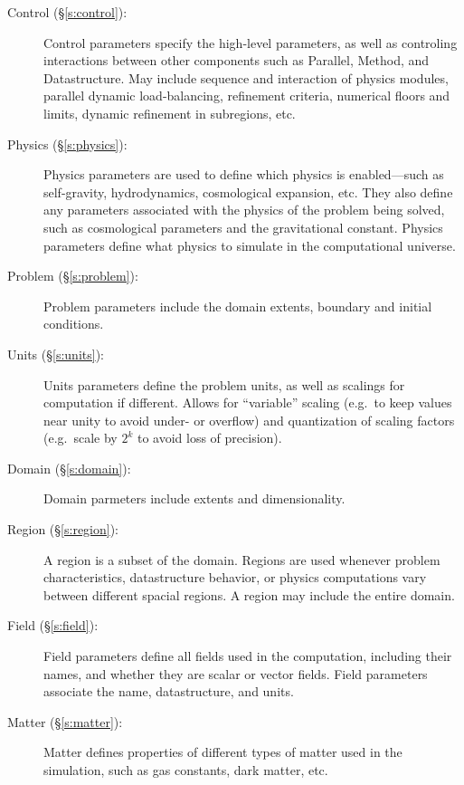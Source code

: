 \begin{description}

 \item [Control (\S\ref{s:control}): ] Control parameters specify the
 high-level parameters, as well as controling interactions between
 other components such as Parallel, Method, and Datastructure.  May
 include sequence and interaction of physics modules, parallel dynamic
 load-balancing, refinement criteria, numerical floors and limits,
 dynamic refinement in subregions, etc.

 \item [Physics (\S\ref{s:physics}): ] Physics parameters are used to
 define which physics is enabled---such as self-gravity,
 hydrodynamics, cosmological expansion, etc.  They also define any
 parameters associated with the physics of the problem being solved,
 such as cosmological parameters and the gravitational constant.
 Physics parameters define what physics to simulate in the
 computational universe.

 \item [Problem (\S\ref{s:problem}): ] Problem parameters include
 the domain extents, boundary and initial conditions.

 \item [Units (\S\ref{s:units}): ] Units parameters define the problem
 units, as well as scalings for computation if different.  Allows for
 ``variable'' scaling (e.g.~to keep values near unity to avoid under-
 or overflow) and quantization of scaling factors (e.g.~scale by $2^k$
 to avoid loss of precision).

 \item [Domain (\S\ref{s:domain}): ] Domain parmeters include extents
 and dimensionality.

 \item [Region (\S\ref{s:region}): ] A region is a subset of the
 domain.  Regions are used whenever problem characteristics,
 datastructure behavior, or physics computations vary between
 different spacial regions.  A region may include the entire
 domain.

 \item [Field (\S\ref{s:field}): ] Field parameters define all fields
 used in the computation, including their names, and whether they are
 scalar or vector fields.  Field parameters associate the name,
 datastructure, and units.

 \item [Matter (\S\ref{s:matter}): ] Matter defines properties of
 different types of matter used in the simulation, such as gas
 constants, dark matter, etc.


\end{description}
